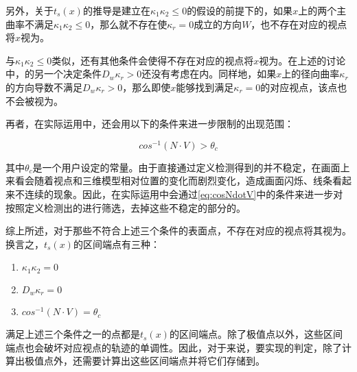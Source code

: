 另外，关于$t_s(x)$的推导是建立在$\kappa_1\kappa_2 \leq 0$的假设的前提下的，如果$x$上的两个主曲率不满足$\kappa_1\kappa_2 \leq 0$，那么就不存在使$\kappa_r = 0$成立的方向$W$，也不存在对应的视点将$x$视为\sconp{}。

与$\kappa_1\kappa_2 \leq 0$类似，还有其他条件会使得不存在对应的视点将$x$视为\sconp{}。在上述的讨论中，\scon{}的另一个决定条件$D_w\kappa_r>0$还没有考虑在内。同样地，如果$x$上的径向曲率$\kappa_r$的方向导数不满足$D_w\kappa_r>0$，那么即使$x$能够找到满足$\kappa_r = 0$的对应视点，该点也不会被视为\sconp{}。

再者，在实际运用中，还会用以下的条件来进一步限制\scon{}的出现范围：

\begin{equation}\label{eq:cosNdotV}
  cos^{-1}(N\cdot{V}) > \theta_c 
\end{equation}

其中$\theta_c$是一个用户设定的常量。由于直接通过定义检测得到的\scon{}并不稳定，在画面上来看会随着视点和三维模型相对位置的变化而剧烈变化，造成画面闪烁、线条看起来不连续的现象。因此，在实际运用中会通过\autoref{eq:cosNdotV}中的条件来进一步对按照定义检测出的\scon{}进行筛选，去掉这些不稳定的部分的\sconp{}。

综上所述，对于那些不符合上述三个条件的表面点，不存在对应的视点将其视为\sconp{}。换言之，$t_s(x)$的区间端点有三种：

\begin{enumerate}
\item $\kappa_1\kappa_2 = 0$
\item $D_w\kappa_r = 0$
\item $cos^{-1}(N\cdot{V}) = \theta_c$
\end{enumerate}

满足上述三个条件之一的点都是$t_s(x)$的区间端点。除了极值点以外，这些区间端点也会破坏对应视点的轨迹的单调性。因此，对于\scon{}来说，要实现\epsl{}的判定，除了计算出极值点外，还需要计算出这些区间端点并将它们存储到\ppll{}。
